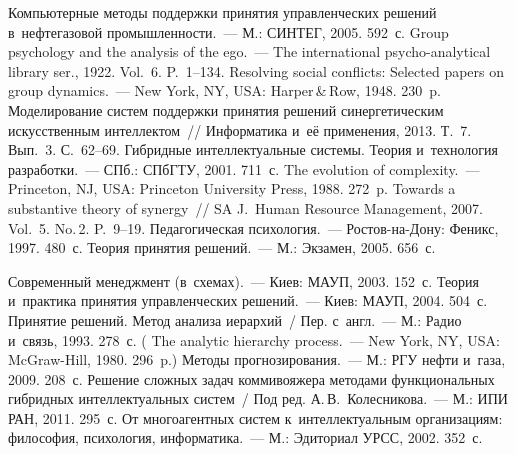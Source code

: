 \begin{multicols}{2}
{\small\frenchspacing
 {%
 \begin{thebibliography}{99}
   Компьютерные 
методы поддержки принятия управленческих решений в~нефтегазовой 
промышленности.~--- М.: СИНТЕГ, 2005. 592~с.
 Group psychology and the analysis of the ego.~--- The international 
psycho-analytical library ser., 1922. Vol.~6. P.~1--134. 
   Resolving social conflicts: Selected papers on group dynamics.~--- 
New York, NY, USA: Harper\,\&\,Row, 1948. 230~p.
   Моделирование 
систем поддержки принятия решений синергетическим искусственным 
интеллектом~// Информатика и~её применения, 2013. Т.~7. Вып.~3. С.~62--69.
   Гибридные интеллектуальные сис\-те\-мы. Теория 
и~технология разработки.~--- СПб.: \mbox{СПбГТУ}, 2001. 711~с.
   The evolution of complexity.~--- Princeton, NJ, USA: 
Princeton University Press, 1988. 272~p.
   Towards a substantive theory of 
synergy~// SA J.~Human Resource Management, 2007. Vol.~5. No.\,2. P.~9--19.
   Педагогическая психология.~--- Ростов-на-Дону: Феникс, 
1997. 480~с.
   Теория принятия решений.~--- М.: 
Экзамен, 2005. 656~с.
  
   Современный менеджмент 
(в~схемах).~--- Киев: МАУП, 2003. 
152~с.
   Теория и~практика принятия управ\-лен\-че\-ских 
решений.~--- Киев: МАУП, 2004. 504~с.
   Принятие решений. Метод анализа иерархий~/ Пер. с~англ.~--- 
  М.: Радио и~связь, 1993. 278~с. ( The analytic hierarchy 
process.~--- New York, NY, USA: McGraw-Hill, 1980. 296~p.)
 Методы прогнозирования.~--- М.: РГУ 
нефти и~газа, 2009. 208~с.
   Решение сложных задач коммивояжера методами 
функциональных гибридных интеллектуальных сис\-тем~/ Под ред. 
А.\,В.~Колесникова.~--- М.: ИПИ РАН, 2011. 295~с.
   От многоагентных систем к~интеллектуальным 
организациям: философия, психология, информатика.~--- М.: Эдиториал УРСС, 
2002. 352~с.

 \end{thebibliography}

 }
 }

\end{multicols}


